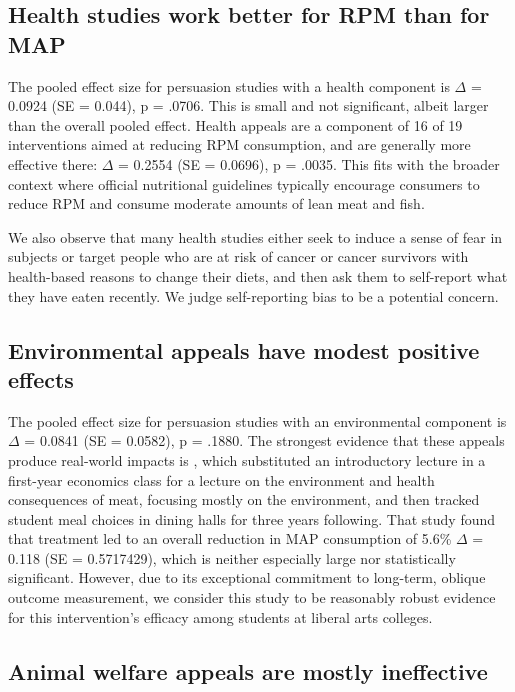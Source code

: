 \documentclass[sn-nature,pdflatex]{sn-jnl}
\begin{document}
\subsection{Health studies work better for RPM than for
MAP}\label{sec2.7}

The pooled effect size for persuasion studies with a health component is
\(\Delta\) = 0.0924 (SE = 0.044), p = .0706. This is small and not
significant, albeit larger than the overall pooled effect. Health
appeals are a component of 16 of 19 interventions aimed at reducing RPM
consumption, and are generally more effective there: \(\Delta\) = 0.2554
(SE = 0.0696), p = .0035. This fits with the broader context where
official nutritional guidelines typically encourage consumers to reduce
RPM and consume moderate amounts of lean meat and fish.

We also observe that many health studies either seek to induce a sense
of fear in subjects \citep{berndsen2005} or target people who are at
risk of cancer \citep{hatami2018} or cancer survivors
\citep{james2015, lee2018} with health-based reasons to change their
diets, and then ask them to self-report what they have eaten recently.
We judge self-reporting bias to be a potential concern.

\subsection{Environmental appeals have modest positive
effects}\label{sec2.8}

The pooled effect size for persuasion studies with an environmental
component is \(\Delta\) = 0.0841 (SE = 0.0582), p = .1880. The strongest
evidence that these appeals produce real-world impacts is
\citep{jalil2023}, which substituted an introductory lecture in a
first-year economics class for a lecture on the environment and health
consequences of meat, focusing mostly on the environment, and then
tracked student meal choices in dining halls for three years following.
That study found that treatment led to an overall reduction in MAP
consumption of 5.6\% \(\Delta\) = 0.118 (SE = 0.5717429), which is
neither especially large nor statistically significant. However, due to
its exceptional commitment to long-term, oblique outcome measurement, we
consider this study to be reasonably robust evidence for this
intervention's efficacy among students at liberal arts colleges.

\subsection{Animal welfare appeals are mostly ineffective}\label{sec2.9}
\end{document}
